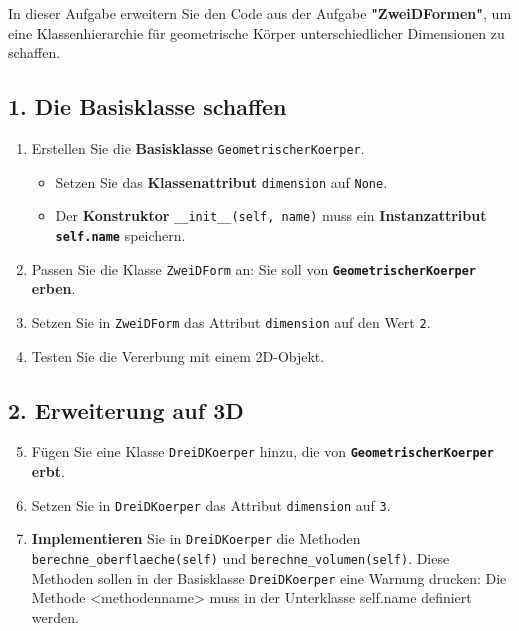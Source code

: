 \begin{myexercise}
    In dieser Aufgabe erweitern Sie den Code aus der Aufgabe \textbf{"ZweiDFormen"}, um eine Klassenhierarchie für geometrische Körper unterschiedlicher Dimensionen zu schaffen.

    \subsection*{1. Die Basisklasse schaffen}
    \begin{enumerate}
        \item Erstellen Sie die \textbf{Basisklasse} \texttt{GeometrischerKoerper}.
        \begin{itemize}
            \item Setzen Sie das \textbf{Klassenattribut} \texttt{dimension} auf \texttt{None}.
            \item Der \textbf{Konstruktor} \texttt{\_\_init\_\_(self, name)} muss ein \textbf{Instanzattribut \texttt{self.name}} speichern.
        \end{itemize}

        \item Passen Sie die Klasse \texttt{ZweiDForm} an: Sie soll von \textbf{\texttt{GeometrischerKoerper} erben}.
        \item Setzen Sie in \texttt{ZweiDForm} das Attribut \texttt{dimension} auf den Wert \texttt{2}.
        \item Testen Sie die Vererbung mit einem 2D-Objekt.
    \end{enumerate}

    \subsection*{2. Erweiterung auf 3D}
    \begin{enumerate}
        \setcounter{enumi}{4} %
        \item Fügen Sie eine Klasse \texttt{DreiDKoerper} hinzu, die von \textbf{\texttt{GeometrischerKoerper} erbt}.
        \item Setzen Sie in \texttt{DreiDKoerper} das Attribut \texttt{dimension} auf \texttt{3}.
        \item \textbf{Implementieren} Sie in \texttt{DreiDKoerper} die Methoden \texttt{berechne\_oberflaeche(self)} und \texttt{berechne\_volumen(self)}. Diese Methoden sollen in der Basisklasse \texttt{DreiDKoerper} eine Warnung drucken: Die Methode <methodenname> muss in der Unterklasse {self.name} definiert werden.
    \end{enumerate}


\end{myexercise}
